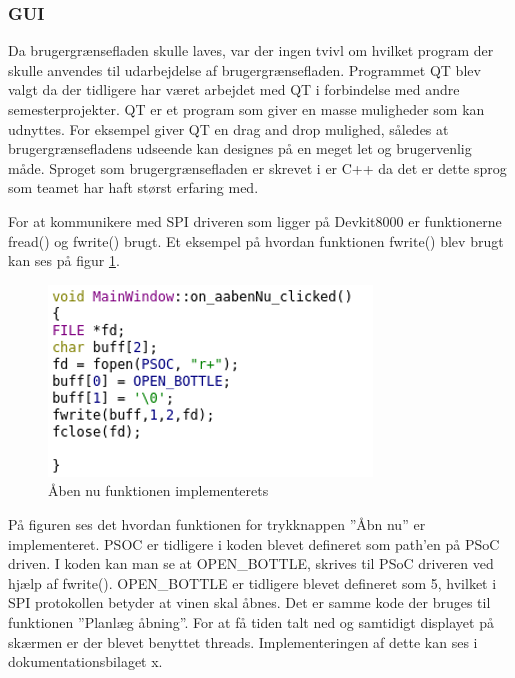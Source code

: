 \subsubsection{GUI}

Da brugergrænsefladen skulle laves, var der ingen tvivl om hvilket program der skulle anvendes til udarbejdelse af brugergrænsefladen. Programmet QT blev valgt da der tidligere har været arbejdet med QT i forbindelse med andre semesterprojekter. QT er et program som giver en masse muligheder som kan udnyttes. For eksempel giver QT en drag and drop mulighed, således at brugergrænsefladens udseende kan designes på en meget let og brugervenlig måde.
Sproget som brugergrænsefladen er skrevet i er C++ da det er dette sprog som teamet har haft størst erfaring med.

For at kommunikere med SPI driveren som ligger på Devkit8000 er funktionerne fread() og fwrite() brugt. Et eksempel på hvordan funktionen fwrite() blev brugt kan ses på figur \ref{ABNU_IMP}.

\begin{figure}[H]
	\includegraphics[scale=1]{tex/Implementering/GUI/GUI-implementering/Billeder/kodeeksempel.png}
	\caption{Åben nu funktionen implementerets}
	\label{ABNU_IMP}
\end{figure}

På figuren ses det hvordan funktionen for trykknappen ”Åbn nu” er implementeret. PSOC er tidligere i koden blevet defineret som path’en på PSoC driven. I koden kan man se at OPEN\_BOTTLE, skrives til PSoC driveren ved hjælp af fwrite(). OPEN\_BOTTLE er tidligere blevet defineret som 5, hvilket i SPI protokollen betyder at vinen skal åbnes. Det er samme kode der bruges til funktionen ”Planlæg åbning”.
For at få tiden talt ned og samtidigt displayet på skærmen er der blevet benyttet threads. Implementeringen af dette kan ses i dokumentationsbilaget x.
